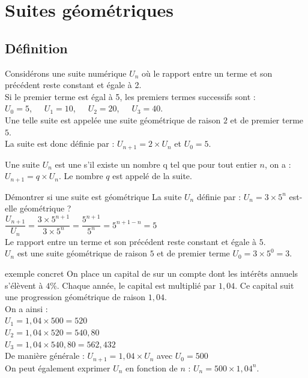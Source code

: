 \chapter{Suites géométriques}
\thispagestyle{fancy}

\section{Définition}

\begin{bexemple}
    Considérons une suite numérique $U_n$ où le rapport entre un terme et son précédent reste constant et égale à 2.\\
    Si le premier terme est égal à 5, les premiers termes successifs sont :\\
    $U_0 = 5$,\ \ \ 
    $U_1 = 10$,\ \ \ 
    $U_2 = 20$,\ \ \ 
    $U_3 = 40$.\\
    Une telle suite est appelée une suite géométrique de raison $2$ et de premier terme $5$.\\
    La suite est donc définie par : $U_{n+1}=2\times U_n$ et $U_0=5$. 
\end{bexemple}

\begin{bdefi}
    Une suite $U_n$ est une  s'il existe un nombre q tel que pour tout entier $n$, on a : $U_{n+1}=q\times U_n$.
    Le nombre $q$ est appelé  de la suite.
\end{bdefi}

\begin{bmethodet}{Démontrer si une suite est géométrique}
    La suite $U_n$ définie par : $U_n=3\times 5^n$  est-elle géométrique ?
    \ \\
    $\dfrac{U_{n+1}}{U_n} =\dfrac{3\times 5^{n+1}}{3\times 5^n}=\dfrac{5^{n+1}}{5^n} =5^{n+1-n}=5$\\
    Le rapport entre un terme et son précédent reste constant et égale à $5$.\\
    $U_n$ est une suite géométrique de raison $5$ et de premier terme $U_0=3\times 5^0=3$.
\end{bmethodet}

\begin{bexemplet}{exemple concret}
    On place un capital de  sur un compte dont les intérêts annuels s'élèvent à $4\%$.
    Chaque année, le capital est multiplié par $1,04$.
    Ce capital suit une progression géométrique de raison $1,04$.\\
    
    On a ainsi :\\ 
    $U_1=1,04\times 500=520$\\		
    $U_2=1,04\times 520=540,80$\\
    $U_3=1,04\times 540,80=562,432$\\	
    De manière générale : $U_{n+1}=1,04\times U_n$ avec $U_0=500$\\ 
    On peut également exprimer $U_n$ en fonction de $n$ : $U_n= 500\times1,04^n$. 
\end{bexemplet}

